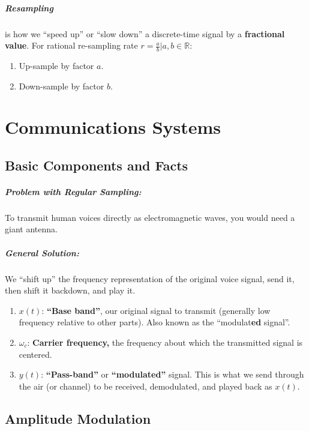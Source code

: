 \documentclass[a4paper,12pt]{report}
\begin{document}
\paragraph{Resampling} is how we ``speed up'' or ``slow down'' a discrete-time signal by a \textbf{fractional value}. For rational re-sampling rate $r = \frac{a}{b} | a,b\in \mathbb{R}$:
\begin{enumerate}
\item Up-sample by factor $a$.
\item Down-sample by factor $b$. 
\end{enumerate}


\chapter{Communications Systems}

\section{Basic Components and Facts}

\paragraph{Problem with Regular Sampling: } To transmit human voices directly as electromagnetic waves, you would need a giant antenna. 

\paragraph{General Solution: } We ``shift up'' the frequency representation of the original voice signal, send it, then shift it backdown, and play it. 
\begin{enumerate}
\item $x(t)$: \textbf{``Base band''}, our original signal to transmit (generally low frequency relative to other parts). Also known as the ``modulat\textbf{ed}  signal''.
\item $\omega_c$: \textbf{Carrier frequency,} the frequency about which the transmitted signal is centered. 
\item $y(t)$: \textbf{``Pass-band''} or \textbf{``modulated''} signal. This is what we send through the air (or channel) to be received, demodulated, and played back as $x(t)$. 
\end{enumerate}

\section{Amplitude Modulation}
\end{document}
